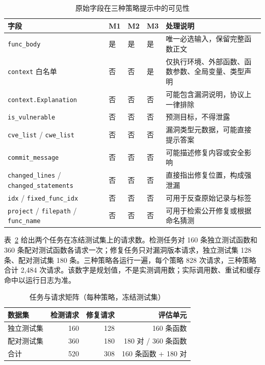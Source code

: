 \documentclass[conference]{IEEEtran}
\begin{document}
\begin{table}[t]
\caption{原始字段在三种策略提示中的可见性}
\label{tab:field-visibility}
\centering
\small
\begin{tabular}{@{}>{\raggedright\arraybackslash}p{4.8cm}lll>{\raggedright\arraybackslash}p{6.0cm}@{}}
\toprule
字段 & M1 & M2 & M3 & 处理说明\\
\midrule
\texttt{func\_body} & 是 & 是 & 是 & 唯一必选输入，保留完整函数正文\\
\texttt{context} 白名单 & 否 & 否 & 是 & 仅执行环境、外部函数、函数参数、全局变量、类型声明\\
\texttt{context.Explanation} & 否 & 否 & 否 & 可能包含漏洞说明，协议上一律排除\\
\texttt{is\_vulnerable} & 否 & 否 & 否 & 预测目标，不得泄露\\
\texttt{cve\_list} / \texttt{cwe\_list} & 否 & 否 & 否 & 漏洞类型元数据，可能直接提示答案\\
\texttt{commit\_message} & 否 & 否 & 否 & 可能描述修复内容或安全影响\\
\texttt{changed\_lines} / \texttt{changed\_statements} & 否 & 否 & 否 & 直接指出修复位置，构成强泄漏\\
\texttt{idx} / \texttt{fixed\_func\_idx} & 否 & 否 & 否 & 可用于反查原始记录与标签\\
\texttt{project} / \texttt{filepath} / \texttt{func\_name} & 否 & 否 & 否 & 可用于检索公开修复或根据命名猜测\\
\bottomrule
\end{tabular}
\end{table}

表~\ref{tab:task-matrix} 给出两个任务在冻结测试集上的请求数。检测任务对 160 条独立测试函数和 360 条配对测试函数各请求一次；修复任务只对漏洞版本请求，独立测试集 128 条、配对测试集 180 条。三种策略各运行一遍，每个策略 828 次请求，三种策略合计 2{,}484 次请求。该数字是规划值，不是实测调用数；实际调用数、重试和缓存命中以运行日志为准。

\begin{table}[t]
\caption{任务与请求矩阵（每种策略，冻结测试集）}
\label{tab:task-matrix}
\centering
\small
\begin{tabular}{@{}lrrr@{}}
\toprule
数据集 & 检测请求 & 修复请求 & 评估单元\\
\midrule
独立测试集 & 160 & 128 & 160 条函数\\
配对测试集 & 360 & 180 & 180 对 / 360 条函数\\
\midrule
合计 & 520 & 308 & 160 条函数 + 180 对\\
\bottomrule
\end{tabular}
\end{table}
\end{document}

